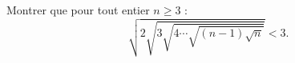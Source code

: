 Montrer que pour tout entier $n \geq 3$ :
\[
\sqrt{2\sqrt{3\sqrt{4\cdots\sqrt{(n-1)\sqrt{n}}}}} < 3.
\]
